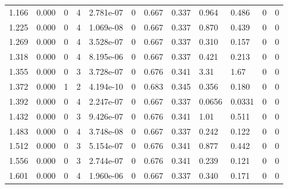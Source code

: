 \documentclass[preview]{standalone}
\begin{document}
{{\begin{tabular}{L{1.2cm}C{1.2cm} C{0.3cm}C{0.5cm} C{1.4cm}C{1.4cm} C{1.4cm}C{1.4cm} C{1.6cm}C{1.6cm} C{1.6cm}C{1.6cm}}
  1.166  &  0.000  & 0     &  4 &  2.781e-07  & 0  &  0.667&   0.337& 0.964 & 0.486   &  0 & 0  \\ 
  1.225  &  0.000  & 0     &  4 &  1.069e-08  & 0  &  0.667&   0.337& 0.870 & 0.439   &  0 & 0  \\ 
  1.269  &  0.000  & 0     &  4 &  3.528e-07  & 0  &  0.667&   0.337& 0.310 & 0.157   &  0 & 0  \\ 
  1.318  &  0.000  & 0     &  4 &  8.195e-06  & 0  &  0.667&   0.337& 0.421 & 0.213   &  0 & 0  \\ 
  1.355  &  0.000  & 0     &  3 &  3.728e-07  & 0  &  0.676&   0.341& 3.31 & 1.67   &  0 & 0  \\ 
  1.372  &  0.000  & 1     &  2 &  4.194e-10  & 0  &  0.683&   0.345& 0.356 & 0.180   &  0 & 0  \\ 
  1.392  &  0.000  & 0     &  4 &  2.247e-07  & 0  &  0.667&   0.337& 0.0656 & 0.0331   &  0 & 0  \\ 
  1.432  &  0.000  & 0     &  3 &  9.426e-07  & 0  &  0.676&   0.341& 1.01 & 0.511   &  0 & 0  \\ 
  1.483  &  0.000  & 0     &  4 &  3.748e-08  & 0  &  0.667&   0.337& 0.242 & 0.122   &  0 & 0  \\ 
  1.512  &  0.000  & 0     &  3 &  5.154e-07  & 0  &  0.676&   0.341& 0.877 & 0.442   &  0 & 0  \\ 
  1.556  &  0.000  & 0     &  3 &  2.744e-07  & 0  &  0.676&   0.341& 0.239 & 0.121   &  0 & 0  \\ 
  1.601  &  0.000  & 0     &  4 &  1.960e-06  & 0  &  0.667&   0.337& 0.340 & 0.171   &  0 & 0  \\ 
\hline 
\end{tabular} 

}}
\end{document}
